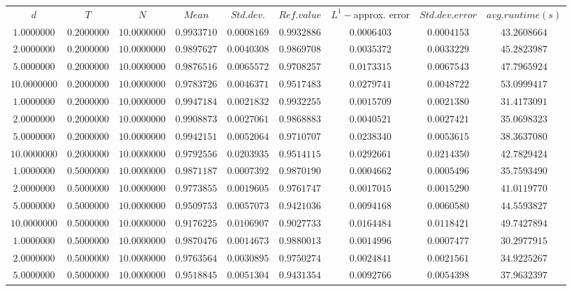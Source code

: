 \begin{tabular}{ccccccccc}
$d$ & $T$ & $N$ & $Mean$ & $Std. dev.$ & $Ref. value$ & $L^1-$approx. error & $Std. dev. error$ & $avg. runtime (s)$\\
$1.0000000$ & $0.2000000$ & $10.0000000$ & $0.9933710$ & $0.0008169$ & $0.9932886$ & $0.0006403$ & $0.0004153$ & $43.2608664$\\
$2.0000000$ & $0.2000000$ & $10.0000000$ & $0.9897627$ & $0.0040308$ & $0.9869708$ & $0.0035372$ & $0.0033229$ & $45.2823987$\\
$5.0000000$ & $0.2000000$ & $10.0000000$ & $0.9876516$ & $0.0065572$ & $0.9708257$ & $0.0173315$ & $0.0067543$ & $47.7965924$\\
$10.0000000$ & $0.2000000$ & $10.0000000$ & $0.9783726$ & $0.0046371$ & $0.9517483$ & $0.0279741$ & $0.0048722$ & $53.0999417$\\
$1.0000000$ & $0.2000000$ & $10.0000000$ & $0.9947184$ & $0.0021832$ & $0.9932255$ & $0.0015709$ & $0.0021380$ & $31.4173091$\\
$2.0000000$ & $0.2000000$ & $10.0000000$ & $0.9908873$ & $0.0027061$ & $0.9868883$ & $0.0040521$ & $0.0027421$ & $35.0698323$\\
$5.0000000$ & $0.2000000$ & $10.0000000$ & $0.9942151$ & $0.0052064$ & $0.9710707$ & $0.0238340$ & $0.0053615$ & $38.3637080$\\
$10.0000000$ & $0.2000000$ & $10.0000000$ & $0.9792556$ & $0.0203935$ & $0.9514115$ & $0.0292661$ & $0.0214350$ & $42.7829424$\\
$1.0000000$ & $0.5000000$ & $10.0000000$ & $0.9871187$ & $0.0007392$ & $0.9870190$ & $0.0004662$ & $0.0005496$ & $35.7593490$\\
$2.0000000$ & $0.5000000$ & $10.0000000$ & $0.9773855$ & $0.0019605$ & $0.9761747$ & $0.0017015$ & $0.0015290$ & $41.0119770$\\
$5.0000000$ & $0.5000000$ & $10.0000000$ & $0.9509753$ & $0.0057073$ & $0.9421036$ & $0.0094168$ & $0.0060580$ & $44.5593827$\\
$10.0000000$ & $0.5000000$ & $10.0000000$ & $0.9176225$ & $0.0106907$ & $0.9027733$ & $0.0164484$ & $0.0118421$ & $49.7427894$\\
$1.0000000$ & $0.5000000$ & $10.0000000$ & $0.9870476$ & $0.0014673$ & $0.9880013$ & $0.0014996$ & $0.0007477$ & $30.2977915$\\
$2.0000000$ & $0.5000000$ & $10.0000000$ & $0.9763564$ & $0.0030895$ & $0.9750274$ & $0.0024841$ & $0.0021561$ & $34.9225267$\\
$5.0000000$ & $0.5000000$ & $10.0000000$ & $0.9518845$ & $0.0051304$ & $0.9431354$ & $0.0092766$ & $0.0054398$ & $37.9632397$\\

\end{tabular}
